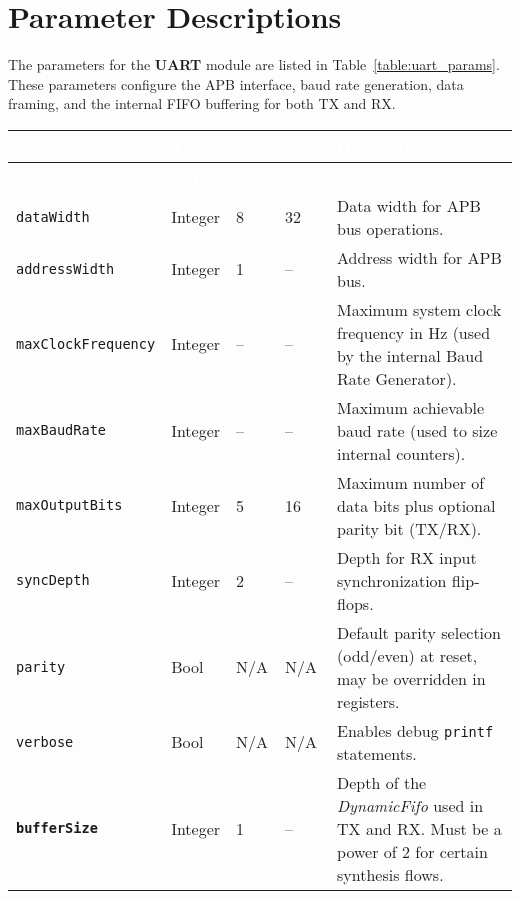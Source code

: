 \section{Parameter Descriptions}

The parameters for the \textbf{UART} module are listed in Table~\ref{table:uart_params}. These parameters configure the APB interface, baud rate generation, data framing, and the internal FIFO buffering for both TX and RX.

\renewcommand*{\arraystretch}{1.3}
\begingroup
\small
{}

\begin{longtable}[H]{
  | p{}
  | p{}
  | p{}
  | p{}
  | p{} |
}
\hline
\rowcolor{gray}
\textcolor{white}{\textbf{Name}} &
\textcolor{white}{\textbf{Type}} &
\textcolor{white}{\textbf{Min}} &
\textcolor{white}{\textbf{Max}} &
\textcolor{white}{\textbf{Description}} \\ 
\hline
\endfirsthead

\hline
\rowcolor{gray}
\textcolor{white}{\textbf{Name}} &
\textcolor{white}{\textbf{Type}} &
\textcolor{white}{\textbf{Min}} &
\textcolor{white}{\textbf{Max}} &
\textcolor{white}{\textbf{Description}} \\ 
\hline
\endhead

\hline
\endfoot

\texttt{dataWidth} &
Integer &
8 &
32 &
Data width for APB bus operations. \\ \hline

\texttt{addressWidth} &
Integer &
1 &
-- &
Address width for APB bus. \\ \hline

\texttt{maxClockFrequency} &
Integer &
-- &
-- &
Maximum system clock frequency in Hz (used by the internal Baud Rate Generator). \\ \hline

\texttt{maxBaudRate} &
Integer &
-- &
-- &
Maximum achievable baud rate (used to size internal counters). \\ \hline

\texttt{maxOutputBits} &
Integer &
5 &
16 &
Maximum number of data bits plus optional parity bit (TX/RX). \\ \hline

\texttt{syncDepth} &
Integer &
2 &
-- &
Depth for RX input synchronization flip‐flops. \\ \hline

\texttt{parity} &
Bool &
N/A &
N/A &
Default parity selection (odd/even) at reset, may be overridden in registers. \\ \hline

\texttt{verbose} &
Bool &
N/A &
N/A &
Enables debug \texttt{printf} statements. \\ \hline

\textbf{\texttt{bufferSize}} &
Integer &
1 &
-- &
Depth of the \textit{DynamicFifo} used in TX and RX. Must be a power of 2 for certain synthesis flows. \\ \hline

\end{longtable}
